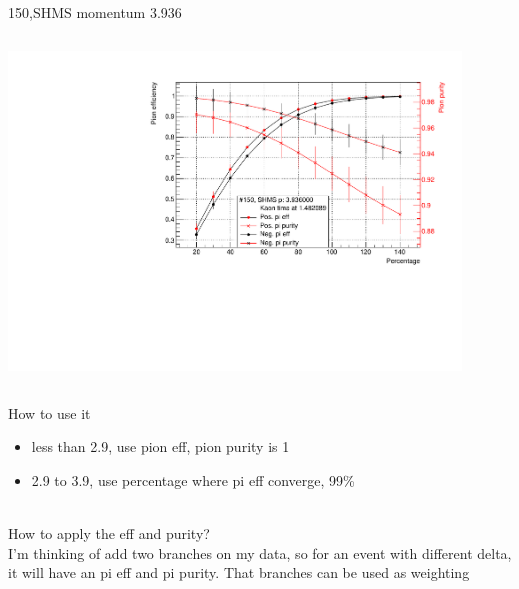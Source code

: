 \documentclass[aspectratio=169,xcolor=dvipsnames]{beamer}
\begin{document}
\begin{frame}{150,SHMS momentum 3.936}
\begin{columns}
\begin{column}[T]{0.3\textwidth}
\includegraphics[width = 0.9\textwidth]{results/pid/SHMS_rf_150_5.pdf}
\end{column}
\end{columns}
\end{frame}
\begin{frame}{How to use it}
\begin{itemize}
    \item less than 2.9, use pion eff, pion purity is 1
    \item 2.9 to 3.9, use percentage where pi eff converge, 99\%
\end{itemize}
    \\
    How to apply the eff and purity?
    \\
    I'm thinking of add two branches on my data, so for an event with different delta, it will have an pi eff and pi purity. That branches can be used as weighting
\end{frame}
\end{document}
